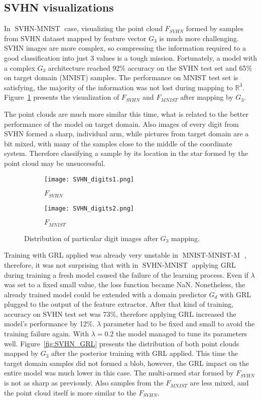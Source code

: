 \documentclass[shortabstract, inz, english]{iithesis}
\DeclareMathOperator{\mnistM}{MNIST-MNIST-M}
\DeclareMathOperator{\svhnM}{SVHN-MNIST}
\newcommand{\mnist}{$\overline{\mnistM}$ }
\newcommand{\svhn}{$\overline{\svhnM}$ }
\begin{document}
\subsection{SVHN visualizations}
\par
In \svhn case, visualizing the point cloud $F_{SVHN}$ formed by samples from SVHN dataset mapped by feature vector $G_{3}$ is much more challenging. SVHN images are more complex, so compressing the information required to a good classification into just 3 values is a tough mission. Fortunately, a model with a complex $G_{3}$ architecture reached 92\% accuracy on the SVHN test set and 65\% on target domain (MNIST) samples. The performance on MNIST test set is satisfying, the majority of the information was not lost during mapping to $\mathbb{R}^{3}$. Figure~\ref{fig:SVHN_Digits} presents the visualization of $F_{SVHN}$ and $F_{MNIST}$ after mapping by $G_{3}$.
\par
The point clouds are much more similar this time, what is related to the better performance of the model on target domain. 
Also images of every digit from SVHN formed a sharp, individual arm, while pictures from target domain are a bit mixed, with many of the samples close to the middle of the coordinate system. Therefore classifying a sample by its location in the star formed by the point cloud may be unsuccessful.

\begin{figure}[htb]%
    \centering
    \begin{subfigure}[b]{0.48\textwidth}
        \texttt{[image: SVHN\_digits1.png]}
        \caption{$F_{SVHN}$}
    \end{subfigure}%
    \begin{subfigure}[b]{0.48\textwidth}
        \texttt{[image: SVHN\_digits2.png]}
        \caption{$F_{MNIST}$}
    \end{subfigure}%
    \caption{Distribution of particular digit images after $G_{3}$ mapping.}%
    \label{fig:SVHN_Digits}%
\end{figure}
\par
Training with GRL applied was already very unstable in \mnist, therefore, it was not surprising that with in \svhn applying GRL during training a fresh model caused the failure of the learning process. Even if $\lambda$ was set to a fixed small value, the loss function became NaN. Nonetheless, the already trained model could be extended with a domain predictor $G_{d}$ with GRL plugged to the output of the feature extractor. After that kind of training, accuracy on SVHN test set was 73\%, therefore applying GRL increased the model's performance by 12\%. $\lambda$ parameter had to be fixed and small to avoid the training failure again. With $\lambda = 0.2$ the model managed to tune its parameters well. Figure~\ref{fig:SVHN_GRL} presents the distribution of both point clouds mapped by $G_{3}$ after the posterior training with GRL applied. This time the target domain samples did not formed a blob, however, the GRL impact on the entire model was much lower in this case. The multi-armed star formed by $F_{SVHN}$ is not as sharp as previously. Also samples from the $F_{MNIST}$ are less mixed, and the point cloud itself is more similar to the $F_{SVHN}$.
\end{document}

